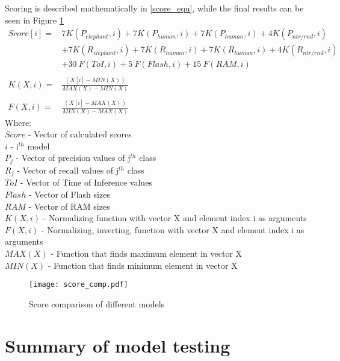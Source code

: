 Scoring is described mathematically in \ref{score_equ}, while the final results can be seen in Figure \ref{score_comp}
\begin{equation}\label{score_equ}
    \begin{aligned}
        Score[i] ={} & 7 K(P_{elephant},i) + 7 K(P_{human},i) + 7 K(P_{human},i) + 4 K(P_{ntr/rnd},i) \\
                     & +{} 7 K(R_{elephant},i) + 7 K(R_{human},i) + 7 K(R_{human},i) + 4 K(R_{ntr/rnd},i) \\
                  & +{} 30\: F(ToI, i) +5\: F(Flash, i) + 15\: F(RAM, i)   \\
                  & \\
        K(X, i) ={}  & \frac{(X[i] - MIN(X))}{MAX(X)- MIN(X)} \\
                  & \\
        F(X, i) ={}  & \frac{(X[i] - MAX(X))}{MIN(X)- MAX(X)}
    \end{aligned}
\end{equation}
\clearpage
Where:\\
$Score$ - Vector of calculated scores\\
$i$ - i$^{th}$ model\\
$P_{j}$ - Vector of precision values of j$^{th}$ class\\
$R_{j}$ - Vector of recall values of j$^{th}$ class\\
$ToI$ - Vector of Time of Inference values\\
$Flash$ - Vector of Flash sizes\\
$RAM$ - Vector of RAM sizes\\
$K(X,i)$ - Normalizing function with vector X and element index i as arguments\\
$F(X,i)$ - Normalizing, inverting, function with vector X and element index i as arguments\\
$MAX(X)$ - Function that finds maximum element in vector X\\
$MIN(X)$ - Function that finds minimum element in vector X

\begin{figure}[ht]
    \centering
    \texttt{[image: score\_comp.pdf]}
    \caption{ Score comparison of different models}
    \label{score_comp}
\end{figure}

\section{ Summary of model testing}

